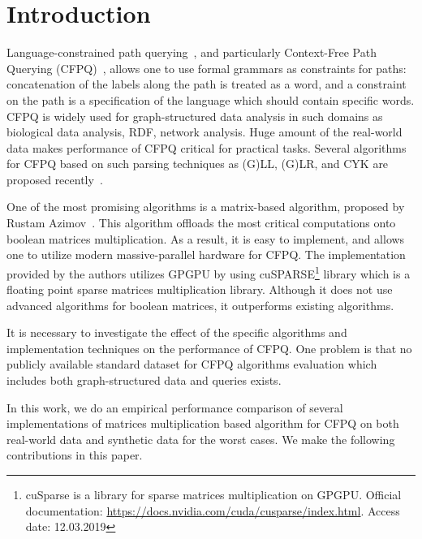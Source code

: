 \section{Introduction}

Language-constrained path querying~\cite{FLCpathProblem}, and particularly Context-Free Path Querying (CFPQ)~\cite{Yannakakis}, allows one to use formal grammars as constraints for paths: concatenation of the labels along the path is treated as a word, and a constraint on the path is a specification of the language which should contain specific words.
CFPQ is widely used for graph-structured data analysis in such domains as biological data analysis, RDF, network analysis.
Huge amount of the real-world data makes performance of CFPQ critical for practical tasks.
Several algorithms for CFPQ based on such parsing techniques as (G)LL, (G)LR, and CYK are proposed recently~\cite{hellingsPathQuerying,Grigorev:2017:CPQ:3166094.3166104,Verbitskaia:2018:PCC:3241653.3241655,RDF,10.1007/978-3-319-91662-0_17,Medeiros:2018:EEC:3167132.3167265}.

One of the most promising algorithms is a matrix-based algorithm, proposed by Rustam Azimov~\cite{Azimov:2018:CPQ:3210259.3210264}.
This algorithm offloads the most critical computations onto boolean matrices multiplication.
As a result, it is easy to implement, and allows one to utilize modern massive-parallel hardware for CFPQ.
The implementation provided by the authors utilizes GPGPU by using cuSPARSE\footnote{cuSparse is a library for sparse matrices multiplication on GPGPU. Official documentation: \url{https://docs.nvidia.com/cuda/cusparse/index.html}. Access date: 12.03.2019} library which is a floating point sparse matrices multiplication library.
Although it does not use advanced algorithms for boolean matrices, it outperforms existing algorithms.

It is necessary to investigate the effect of the specific algorithms and implementation techniques on the performance of CFPQ.
One problem is that no publicly available standard dataset for CFPQ algorithms evaluation which includes both graph-structured data and queries exists.

In this work, we do an empirical performance comparison of several implementations of matrices multiplication based algorithm for CFPQ on both real-world data and synthetic data for the worst cases.
We make the following contributions in this paper.

